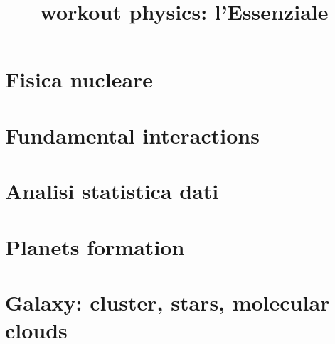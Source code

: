 \documentclass[oneside,20pt,fleqn,extrafontsizes]{memoir}
\title{workout physics: l'Essenziale}
\begin{document}
\pagestyle{mystyle}%
\renewcommand*{\contentsname}{\label{toc}{Table of Contents}}%
\maketitle
\listoftodos
\tableofcontents*

\part{Fisica nucleare}

%

\part{Fundamental interactions}\label{intfon}




\part{Analisi statistica dati}\label{asd}




\part{Planets formation}\label{ppd}


\part{Galaxy: cluster, stars, molecular clouds}\label{stars}



\end{document}
